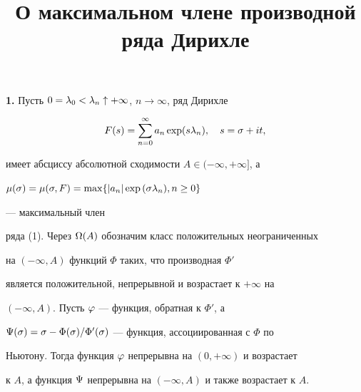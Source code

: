\title{О максимальном члене производной ряда Дирихле}





\date{}







\pagestyle{plain} %













\maketitle


\label{begin}





{\bf 1.}  Пусть $0=\lambda_0<\lambda_n\uparrow+\infty$, $n\to\infty$, ряд Дирихле


\begin{equation}


F(s)=\sum_{n=0}^{\infty}a_n\exp(s\la_n),\quad s=\s+it,


\end{equation}


имеет абсциссу абсолютной сходимости $A\in(-\infty,+\infty]$, а


$\mu(\s)=\mu(\s,F)=\max\{|a_n|\exp{(\s\la_n)},\linebreak n\ge 0\}$


--- максимальный член


ряда (1). Через $\Omega(A)$ обозначим класс положительных неограниченных


на $(-\infty,A)$ функций $\Phi$ таких, что производная $\Phi'$


является положительной, непрерывной и возрастает к $+\infty$ на


$(-\infty,A)$. Пусть $\varphi$ --- функция, обратная к $\Phi'$, а


$\Psi(\sigma)=\sigma-\Phi(\sigma)/\Phi'(\sigma)$ --- функция, ассоциированная с $\Phi$ по


Ньютону. Тогда функция $\varphi$ непрерывна на $(0,+\infty)$ и возрастает 


к $A$, а функция  $\Psi$  непрерывна на $(-\infty,A)$ и также возрастает к $A$.


